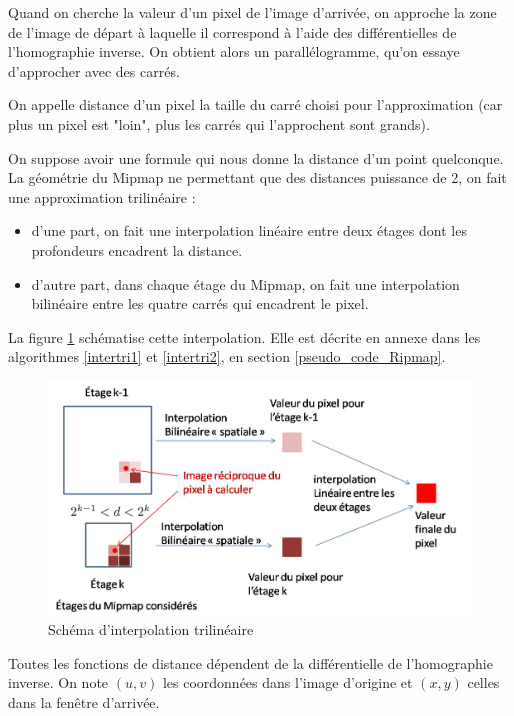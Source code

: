 Quand on cherche la valeur d'un pixel de l'image d'arrivée, on approche la zone de l'image de départ à laquelle il correspond à l'aide des différentielles de l'homographie inverse. On obtient alors un parallélogramme, qu'on essaye d'approcher avec des carrés. 


On appelle distance d'un pixel la taille du carré choisi pour l'approximation (car plus un pixel est "loin", plus les carrés qui l'approchent sont grands). 

On suppose avoir une formule qui nous donne la distance d'un point quelconque. La géométrie du Mipmap ne permettant que des distances puissance de 2, on fait une approximation trilinéaire : 

\begin{itemize}
  \item d'une part, on fait une interpolation linéaire entre deux étages dont les profondeurs encadrent la distance.
  \item d'autre part, dans chaque étage du Mipmap, on fait une interpolation bilinéaire entre les quatre carrés qui encadrent le pixel.
\end{itemize}

La figure \ref{intertrilineaire} schématise cette interpolation. Elle est décrite en annexe dans les algorithmes \ref{intertri1} et \ref{intertri2}, en section \ref{pseudo_code_Ripmap}.

\begin{figure}[h!]
\centering
\includegraphics[scale=0.5]{intertrilineaire.jpg}
\caption{Schéma d'interpolation trilinéaire}
\label{intertrilineaire}
\end{figure}


\label{fonctiondistance}
Toutes les fonctions de distance dépendent de la différentielle de l'homographie inverse.
On note $(u,v)$ les coordonnées dans l'image d'origine et $(x,y)$ celles dans la fenêtre d'arrivée.

